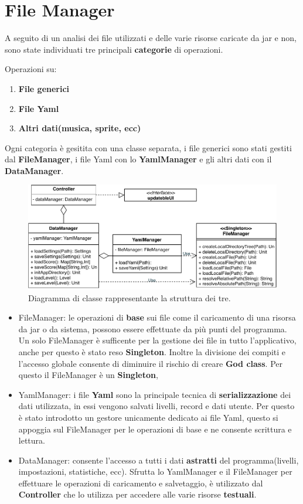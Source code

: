\section{File Manager}
\label{sec:file_manager_design}
A seguito di un analisi dei file utilizzati e delle varie risorse caricate da jar e non, sono state individuati tre principali \textbf{categorie} di operazioni.

\hfill \break
Operazioni su:
\begin{enumerate}
    \item \textbf{File generici}
    \item \textbf{File Yaml}
    \item \textbf{Altri dati(musica, sprite, ecc)}
\end{enumerate}

Ogni categoria è gesitita con una classe separata, i file generici sono stati gestiti dal \textbf{FileManager}, i file Yaml con lo \textbf{YamlManager} e gli altri dati con il \textbf{DataManager}.


\begin{figure}[H]
	\centering
	\includegraphics[width=0.90\columnwidth]{drawio/fileManager/fileManager.pdf}
	\caption{Diagramma di classe rappresentante la struttura dei tre.}
	\label{fig:FileManager}
\end{figure}

\begin{itemize}
    \item FileManager: le operazioni di \textbf{base} sui file come il caricamento di una risorsa da jar o da sistema, possono essere effettuate da più punti del programma.
    Un solo FileManager è sufficente per la gestione dei file in tutto l'applicativo, anche per questo è stato reso \textbf{Singleton}.
    Inoltre la divisione dei compiti e l'accesso globale consente di diminuire il rischio di creare \textbf{God class}.
    Per questo il FileManager è un \textbf{Singleton}, 
    \item YamlManager: i file \textbf{Yaml} sono la principale tecnica di \textbf{serializzazione} dei dati utilizzata, in essi vengono salvati livelli, record e dati utente.
    Per questo è stato introdotto un gestore unicamente dedicato ai file Yaml, questo si appoggia sul FileManager per le operazioni di base e ne consente
    scrittura e lettura.
    \item DataManager: consente l'accesso a tutti i dati \textbf{astratti} del programma(livelli, impostazioni, statistiche, ecc).
    Sfrutta lo YamlManager e il FileManager per effettuare le operazioni di caricamento e salvetaggio, è utilizzato dal \textbf{Controller} che lo utilizza per accedere alle varie risorse \textbf{testuali}.
\end{itemize}